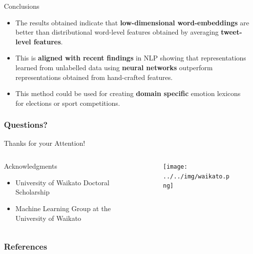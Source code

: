 \documentclass[handout]{beamer}
\begin{document}
\begin{frame}{Conclusions}
\begin{scriptsize}
\begin{itemize}
\item The results obtained indicate that \textbf{low-dimensional word-embeddings} are better than distributional word-level features obtained by averaging \textbf{tweet-level features}.  
\item This is \textbf{aligned with recent findings} in NLP showing that representations learned from unlabelled data using \textbf{neural networks} outperform representations obtained from hand-crafted features.
\item This method could be used for creating \textbf{domain specific} emotion lexicons for elections or sport competitions.
\end{itemize}
\end{scriptsize}
\end{frame}





\begin{frame}
\frametitle{Questions?}
\begin{center}\LARGE Thanks for your Attention!\\ \end{center}

\begin{columns}
\begin{column}{0.55\textwidth}
\begin{block}{Acknowledgments}
\begin{itemize}\tiny
	\item University of Waikato Doctoral Scholarship
	\item Machine Learning Group at the University of Waikato
	
\end{itemize}
\end{block}
\end{column}
\begin{column}{0.45\textwidth}
\vspace{1.5cm}

\begin{figure}[h!]
	\centering
	\texttt{[image: ../../img/waikato.png]}
\end{figure}
\end{column}
\end{columns}

\end{frame}

\begin{frame}[allowframebreaks]\scriptsize
\frametitle{References}


%
\end{frame}  


\end{document}
